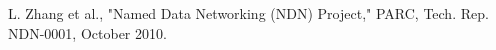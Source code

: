 \documentclass[a0paper,portrait]{baposter}
\begin{document}
\begin{poster}
{		\vspace{-0.3cm}
		\renewcommand{\refname}{}
		\begin{thebibliography}{00}
			 L. Zhang et al., "Named Data Networking (NDN) Project," PARC, Tech. Rep. NDN-0001, October 2010.
		\end{thebibliography}
	}

\end{poster}
\end{document}
